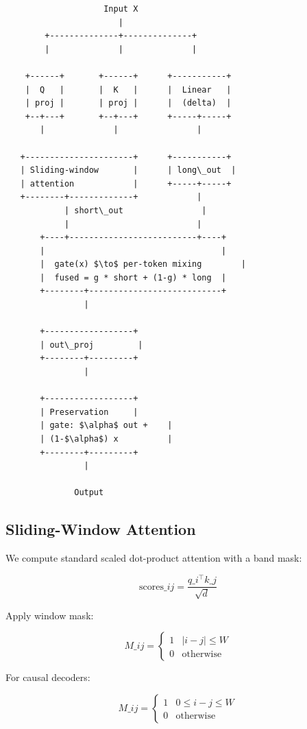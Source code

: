 \begin{lstlisting}
                    Input X
                       |
        +--------------+--------------+
        |              |              |
                                       
    +------+       +------+      +-----------+
    |  Q   |       |  K   |      |  Linear   |
    | proj |       | proj |      |  (delta)  |
    +--+---+       +--+---+      +-----+-----+
       |              |                |
                                        
   +----------------------+      +-----------+
   | Sliding-window       |      | long\_out  |
   | attention            |      +-----+-----+
   +--------+-------------+            |
            | short\_out                |
            |                          |
       +----+--------------------------+----+
       |                                    |
       |  gate(x) $\to$ per-token mixing        |
       |  fused = g * short + (1-g) * long  |
       +--------+---------------------------+
                |
                 
       +------------------+
       | out\_proj         |
       +--------+---------+
                |
                 
       +------------------+
       | Preservation     |
       | gate: $\alpha$ out +    |
       | (1-$\alpha$) x          |
       +--------+---------+
                |
                 
              Output
\end{lstlisting}

\subsection{Sliding-Window Attention}

We compute standard scaled dot-product attention with a band mask:

\[
\text{scores}\_{ij} = \frac{q\_i^\top k\_j}{\sqrt{d}}
\tag{4.1}
\]

Apply window mask:

\[
M\_{ij} = \begin{cases} 1 & |i - j| \leq W \\ 0 & \text{otherwise} \end{cases}
\tag{4.2}
\]

For causal decoders:

\[
M\_{ij} = \begin{cases} 1 & 0 \leq i - j \leq W \\ 0 & \text{otherwise} \end{cases}
\tag{4.3}
\]


